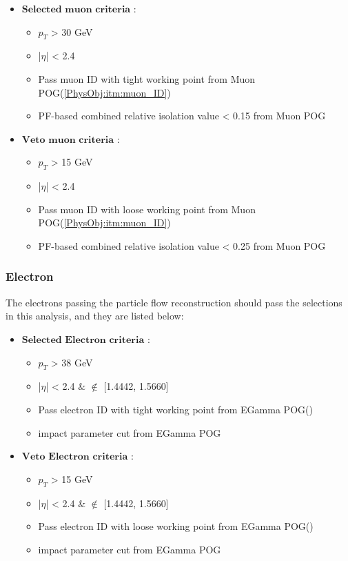 			\begin{itemize}
				\item $\textbf{Selected muon criteria}$ : 
					\begin{itemize}
						\item $p_T$ > 30 GeV
						\item |$\eta$| < 2.4
						\item Pass muon ID with tight working point from Muon POG\cite{muon_POG}(\ref{PhysObj:itm:muon_ID})
						\item PF-based combined relative isolation value < 0.15 from Muon POG\cite{muon_POG}
					\end{itemize}
				\item $\textbf{Veto muon criteria}$ : 
					\begin{itemize}
						\item $p_T$ > 15 GeV
						\item |$\eta$| < 2.4
						\item Pass muon ID with loose working point from Muon POG\cite{muon_POG}(\ref{PhysObj:itm:muon_ID})
						\item PF-based combined relative isolation value < 0.25 from Muon POG\cite{muon_POG}
					\end{itemize}
			\label{PhysObj:itm:muon_selection}
			\end{itemize}
			
		\subsubsection{Electron}
		\label{sssec:PhysObj_ElectronReco}

			\cite{2015_el_reco}


			The electrons passing the particle flow reconstruction should pass the selections in this analysis, and they are listed below:

			\begin{itemize}
				\item $\textbf{Selected Electron criteria}$ : 
					\begin{itemize}
						\item $p_T$ > 38 GeV
						\item |$\eta$| < 2.4 $\&$ $\notin$ [1.4442, 1.5660]
						\item Pass electron ID with tight working point from EGamma POG\cite{egamma_POG}()
						\item impact parameter cut from EGamma POG\cite{egamma_POG}
					\end{itemize}
				\item $\textbf{Veto Electron criteria}$ : 
					\begin{itemize}
						\item $p_T$ > 15 GeV
						\item |$\eta$| < 2.4 $\&$ $\notin$ [1.4442, 1.5660]
						\item Pass electron ID with loose working point from EGamma POG\cite{egamma_POG}()
						\item impact parameter cut from EGamma POG\cite{egamma_POG}
					\end{itemize}
			\label{PhysObj:itm:electron_selection}
			\end{itemize}

